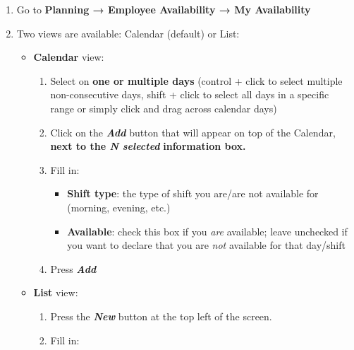 \documentclass[
  paper=a4,
  ,captions=tableheading
]{scrartcl}
\providecommand{\tightlist}{%
  \setlength{\itemsep}{0pt}\setlength{\parskip}{0pt}}
\begin{document}
\begin{enumerate}
\def\labelenumi{\arabic{enumi}.}
\tightlist
\item
  Go to \textbf{Planning → Employee Availability → My Availability}
\item
  Two views are available: Calendar (default) or List:

  \begin{itemize}
  \tightlist
  \item
    \textbf{Calendar} view:

    \begin{enumerate}
    \def\labelenumii{\arabic{enumii}.}
    \tightlist
    \item
      Select on \textbf{one or multiple days} (control + click to select
      multiple non-consecutive days, shift + click to select all days in
      a specific range or simply click and drag across calendar days)
    \item
      Click on the \textbf{\emph{Add}} button that will appear on top of
      the Calendar, \textbf{next to the \emph{N selected}}
      \textbf{information box.}
    \item
      Fill in:

      \begin{itemize}
      \tightlist
      \item
        \textbf{Shift type}: the type of shift you are/are not available
        for (morning, evening, etc.)
      \item
        \textbf{Available}: check this box if you \emph{are} available;
        leave unchecked if you want to declare that you are \emph{not}
        available for that day/shift
      \end{itemize}
    \item
      Press \textbf{\emph{Add}}
    \end{enumerate}
  \item
    \textbf{List} view:

    \begin{enumerate}
    \def\labelenumii{\arabic{enumii}.}
    \tightlist
    \item
      Press the \textbf{\emph{New}} button at the top left of the
      screen.
    \item
      Fill in:


\end{enumerate}
\end{itemize}
\end{enumerate}
\end{document}
